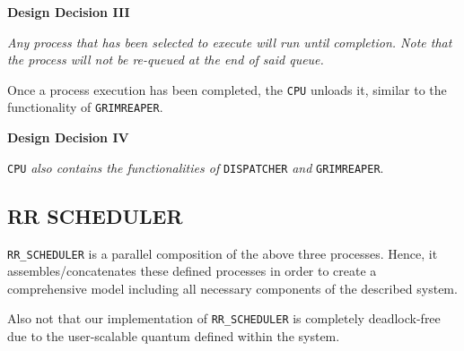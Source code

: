 \documentclass[]{article}
\begin{document}
\begin{mdframed}[backgroundcolor=lightgray!40]
	\textbf{Design Decision III} \par 
	\textit{Any process that has been selected to execute will run until completion. Note that the process will not be re-queued at the end of said queue.}
\end{mdframed}

\vspace{2mm}

Once a process execution has been completed, the \verb|CPU| unloads it, similar to the functionality of \verb|GRIMREAPER|. 

\vspace{2mm}

\begin{mdframed}[backgroundcolor=lightgray!40]
	\textbf{Design Decision IV} \par 
	\verb|CPU| \textit{also contains the functionalities of} \verb|DISPATCHER| \textit{and} \verb|GRIMREAPER|.
\end{mdframed}

\subsection*{RR SCHEDULER}
\verb|RR_SCHEDULER| is a parallel composition of the above three processes. Hence, it assembles/concatenates these defined processes in order to create a comprehensive model including all necessary components of the described system. \par \vspace{2mm}
Also not that our implementation of \verb|RR_SCHEDULER| is completely deadlock-free due to the user-scalable quantum defined within the system.
\end{document}
